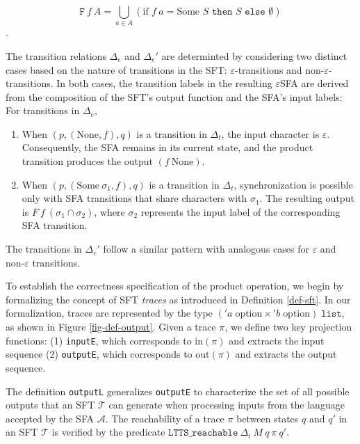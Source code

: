 \documentclass[a4paper,UKenglish,cleveref, autoref, anonymous, thm-restate]{lipics-v2021}
\begin{document}
\[\texttt{F}~f~A=\bigcup_{a\in A} (\text{if }f~a= \text{Some }S \texttt{ then } S \texttt{ else } \emptyset)\].

The transition relations $\Delta_e$ and $\Delta_e'$ are determinted by considering two distinct cases based on the nature of transitions in the SFT: $\varepsilon$-transitions and non-$\varepsilon$-transitions. In both cases, the transition labels in the resulting $\varepsilon$SFA are derived from the composition of the SFT's output function and the SFA's input labels:
For transitions in $\Delta_e$, 

\begin{enumerate}
\item When $(p, (\text{None}, f), q)$ is a transition in $\Delta_t$, the input character is $\varepsilon$. Consequently, the SFA remains in its current state, and the product transition produces the output $(f~\text{None})$.

\item When $(p, (\text{Some}~\sigma_1, f), q)$ is a transition in $\Delta_t$, synchronization is possible only with SFA transitions that share characters with $\sigma_1$. The resulting output is $F~f~(\sigma_1\cap\sigma_2)$, where $\sigma_2$ represents the input label of the corresponding SFA transition.
\end{enumerate}

The transitions in $\Delta_e'$ follow a similar pattern with analogous cases for $\varepsilon$ and non-$\varepsilon$ transitions.

To establish the correctness specification of the product operation, we begin by formalizing the concept of SFT \emph{traces} as introduced in Definition \ref{def-sft}. In our formalization, traces are represented by the type $('a\;\text{option} \times 'b\;\text{option})\;\texttt{list}$, as shown in Figure \ref{fig-def-output}.
%
Given a trace $\pi$, we define two key projection functions:
(1) \texttt{inputE}, which corresponds to $\text{in}(\pi)$ and extracts the input sequence
(2) \texttt{outputE}, which corresponds to $\text{out}(\pi)$ and extracts the output sequence.

The definition \texttt{outputL} generalizes \texttt{outputE} to characterize the set of all possible outputs that an SFT $\mathcal{T}$ can generate when processing inputs from the language accepted by the SFA $\mathcal{A}$. The reachability of a trace $\pi$ between states $q$ and $q'$ in an SFT $\mathcal{T}$ is verified by the predicate $\texttt{LTTS\_reachable}~\Delta_t~M~q~\pi~q'$.
\end{document}
